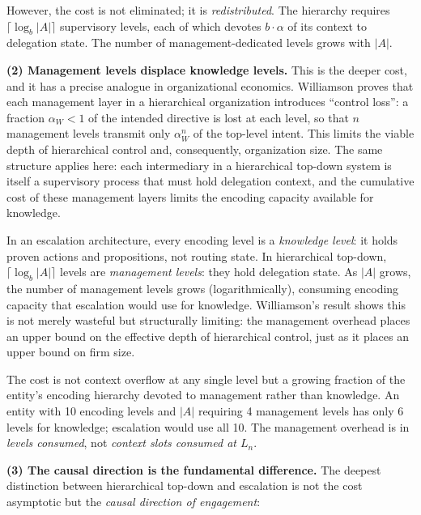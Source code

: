 \documentclass[11pt]{article}
\theoremstyle{definition}
\begin{document}
However, the cost is not eliminated; it is \emph{redistributed}.
The hierarchy requires $\lceil \log_b |A| \rceil$ supervisory levels,
each of which devotes $b \cdot \alpha$ of its context to delegation
state. The number of management-dedicated levels grows with $|A|$.

\textbf{(2) Management levels displace knowledge levels.}
This is the deeper cost, and it has a precise analogue in organizational
economics. Williamson \cite{Williamson1967} proves that each management
layer in a hierarchical organization introduces ``control loss'': a
fraction $\alpha_W < 1$ of the intended directive is lost at each level,
so that $n$ management levels transmit only $\alpha_W^n$ of the
top-level intent. This limits the viable depth of hierarchical control
and, consequently, organization size. The same structure applies here:
each intermediary in a hierarchical top-down system is itself a
supervisory process that must hold delegation context, and the
cumulative cost of these management layers limits the encoding
capacity available for knowledge.

In an escalation architecture, every encoding level is a
\emph{knowledge level}: it holds proven actions and propositions, not
routing state. In hierarchical top-down, $\lceil \log_b |A| \rceil$
levels are \emph{management levels}: they hold delegation state. As
$|A|$ grows, the number of management levels grows (logarithmically),
consuming encoding capacity that escalation would use for knowledge.
Williamson's result shows this is not merely wasteful but structurally
limiting: the management overhead places an upper bound on the
effective depth of hierarchical control, just as it places an upper
bound on firm size.

The cost is not context overflow at any single level but a growing
fraction of the entity's encoding hierarchy devoted to management rather
than knowledge. An entity with 10 encoding levels and $|A|$ requiring
4 management levels has only 6 levels for knowledge; escalation would
use all 10. The management overhead is in \emph{levels consumed}, not
\emph{context slots consumed at $L_n$}.

\textbf{(3) The causal direction is the fundamental difference.}
The deepest distinction between hierarchical top-down and escalation is
not the cost asymptotic but the \emph{causal direction of engagement}:
\end{document}
